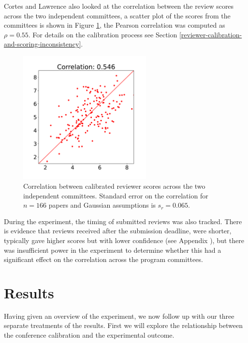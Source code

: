 \documentclass[twoside]{article}
\begin{document}
Cortes and Lawrence also looked at the correlation between the review scores across the two independent committees, a scatter plot of the scores from the committees is shown in Figure \ref{figure-calibrated-quality-correlation}, the Pearson correlation was computed as $\rho=0.55$. For details on the calibration process see Section \ref{reviewer-calibration-and-scoring-inconsistency}.

\begin{figure}[htb]
\includegraphics[width=0.60\textwidth]{diagrams/neurips/calibrated-quality-correlation.pdf}

\caption{Correlation between calibrated reviewer scores across the two independent committees. Standard error on the correlation for $n=166$ papers and Gaussian assumptions is $s_r = 0.065$.}
\label{figure-calibrated-quality-correlation}
\end{figure}

During the experiment, the timing of submitted reviews was also tracked. There is evidence that reviews received after the submission deadline, were shorter, typically gave higher scores but with lower confidence (see Appendix \label{effect-of-late-reviews}), but there was insufficient power in the experiment to determine whether this had a significant effect on the correlation across the program committees. 

\section{Results}

Having given an overview of the experiment, we now follow up with our three separate treatments of the results. First we will explore the relationship between the conference calibration and the experimental outcome.
\end{document}
